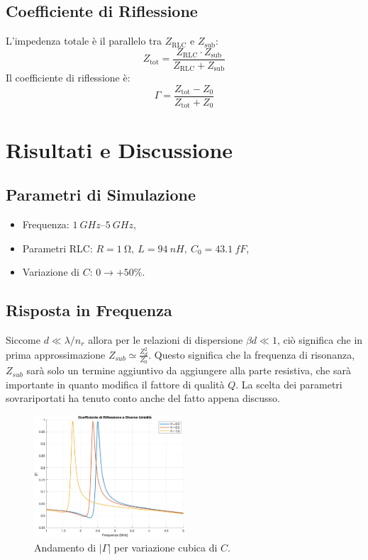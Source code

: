 \documentclass[conference]{IEEEtran}
\begin{document}
\subsection{Coefficiente di Riflessione}
L'impedenza totale è il parallelo tra \(Z_{\text{RLC}}\) e \(Z_{\text{sub}}\):
\[
Z_{\text{tot}} = \frac{Z_{\text{RLC}} \cdot Z_{\text{sub}}}{Z_{\text{RLC}} + Z_{\text{sub}}}
\]
Il coefficiente di riflessione è:
\[
\Gamma = \frac{Z_{\text{tot}} - Z_0}{Z_{\text{tot}} + Z_0}
\]

\section{Risultati e Discussione}
\subsection{Parametri di Simulazione}
\begin{itemize}
    \item Frequenza: \(\SIrange{1}{5}{GHz}\),
    \item Parametri RLC: \(R = \SI{1}{\ohm},\ L = \SI{94}{nH},\ C_0 = \SI{43.1}{fF}\),
    \item Variazione di \(C\): \(0 \to + 50\%\).
\end{itemize}

\subsection{Risposta in Frequenza}
Siccome $ d \ll \lambda/n_r$ allora per le relazioni di dispersione $\beta d \ll 1$, ciò significa che in prima approssimazione $Z_{sub} \simeq \frac{Z_d^2}{Z_0}$. Questo significa che  la frequenza di risonanza, $Z_{sub}$ sarà solo un termine aggiuntivo da aggiungere alla parte resistiva, che sarà importante in quanto modifica il fattore di qualità $Q$. La scelta dei parametri sovrariportati ha tenuto conto anche del fatto appena discusso.
\begin{figure}[ht!]
    \centering
    \includegraphics[width=0.5\textwidth]{img/grafici.png}
    \caption{Andamento di \(|\Gamma|\) per variazione cubica di \(C\). }
    \label{fig:gamma}
\end{figure}
\end{document}

